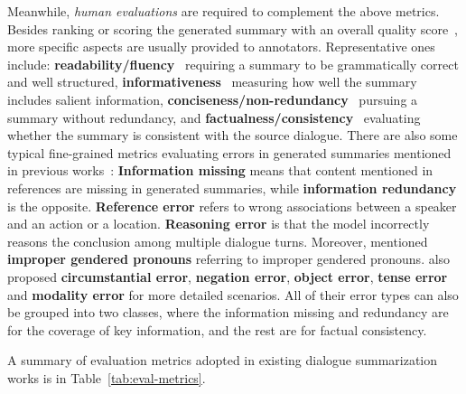 Meanwhile, \textit{human evaluations} are required to complement the above metrics.
Besides ranking or scoring the generated summary with an overall quality score~\cite{chen2020multi}, 
more specific aspects are usually provided to annotators. Representative ones include:
\textbf{readability/fluency}~\cite{yuan2019scaffolds,zhao2021give} requiring a summary to be grammatically correct and well structured,
\textbf{informativeness}~\cite{feng2020dialogue,lei2021finer,feigenblat-etal-2021-tweetsumm-dialog,feng2021language} measuring how well the summary includes salient information,
\textbf{conciseness/non-redundancy}~\cite{feng2021language,yuan2019scaffolds} pursuing a summary without redundancy,
and \textbf{factualness/consistency}~\cite{feng2020dialogue,zhao2021give,lei2021finer,kim2022mind} evaluating whether the summary is consistent with the source dialogue. There are also some typical fine-grained metrics evaluating errors in generated summaries mentioned in previous works~\cite{chen2020multi,chen2021dialsumm,liu2021coreference}: 
\textbf{Information missing} means that content mentioned in references are missing in generated summaries, while \textbf{information redundancy} is the opposite.
\textbf{Reference error} refers to wrong associations between a speaker and an action or a location.
\textbf{Reasoning error} is that the model incorrectly reasons the conclusion among multiple dialogue turns.
Moreover, \citet{chen2020multi} mentioned \textbf{improper gendered pronouns} referring to improper gendered pronouns. \citet{tang2021confit} also proposed \textbf{circumstantial error}, \textbf{negation error}, \textbf{object error}, \textbf{tense error} and \textbf{modality error} for more detailed scenarios. All of their error types can also be grouped into two classes, where the information missing and redundancy are for the coverage of key information, and the rest are for factual consistency.


A summary of evaluation metrics adopted in existing dialogue summarization works is in Table~\ref{tab:eval-metrics}.

